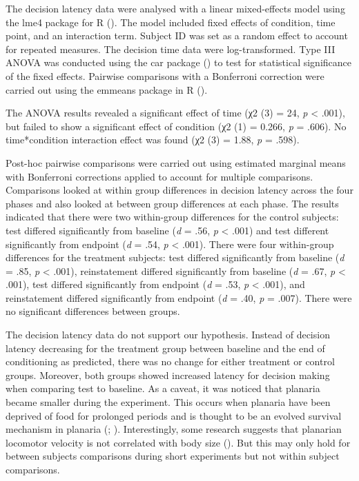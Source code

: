 \documentclass[
  jou,
  floatsintext,
  longtable,
  nolmodern,
  notxfonts,
  notimes,
  donotrepeattitle,
  colorlinks=true,linkcolor=blue,citecolor=blue,urlcolor=blue]{apa7}
\begin{document}
The decision latency data were analysed with a linear mixed-effects
model using the lme4 package for R
(). The model
included fixed effects of condition, time point, and an interaction
term. Subject ID was set as a random effect to account for repeated
measures. The decision time data were log-transformed. Type III ANOVA
was conducted using the car package () to test for statistical significance of the fixed
effects. Pairwise comparisons with a Bonferroni correction were carried
out using the emmeans package in R
().

The ANOVA results revealed a significant effect of time (χ2 (3) = 24,
\emph{p} \textless{} .001), but failed to show a significant effect of
condition (χ2 (1) = 0.266, \emph{p} = .606). No time*condition
interaction effect was found (χ2 (3) = 1.88, \emph{p} = .598).

Post-hoc pairwise comparisons were carried out using estimated marginal
means with Bonferroni corrections applied to account for multiple
comparisons. Comparisons looked at within group differences in decision
latency across the four phases and also looked at between group
differences at each phase. The results indicated that there were two
within-group differences for the control subjects: test differed
significantly from baseline (\emph{d} = .56, \emph{p} \textless{} .001)
and test different significantly from endpoint (\emph{d} = .54, \emph{p}
\textless{} .001). There were four within-group differences for the
treatment subjects: test differed significantly from baseline (\emph{d}
= .85, \emph{p} \textless{} .001), reinstatement differed significantly
from baseline (\emph{d} = .67, \emph{p} \textless{} .001), test differed
significantly from endpoint (\emph{d} = .53, \emph{p} \textless{} .001),
and reinstatement differed significantly from endpoint (\emph{d} = .40,
\emph{p} = .007). There were no significant differences between groups.

The decision latency data do not support our hypothesis. Instead of
decision latency decreasing for the treatment group between baseline and
the end of conditioning as predicted, there was no change for either
treatment or control groups. Moreover, both groups showed increased
latency for decision making when comparing test to baseline. As a
caveat, it was noticed that planaria became smaller during the
experiment. This occurs when planaria have been deprived of food for
prolonged periods and is thought to be an evolved survival mechanism in
planaria
(; ).
Interestingly, some research suggests that planarian locomotor velocity
is not correlated with body size
(). But this
may only hold for between subjects comparisons during short experiments
but not within subject comparisons.
\end{document}
